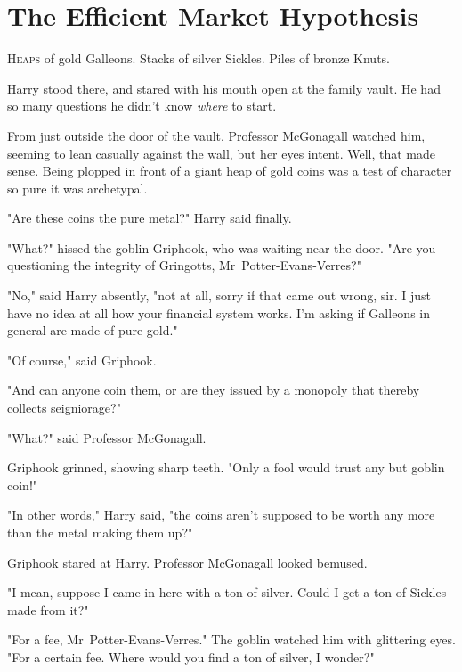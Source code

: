 \chapter[The Efficient Market Hypothesis]{The Efficient Market Hypothesis\protect\footnotemark}


\lettrine{H}{eaps} of gold Galleons. Stacks of silver Sickles. Piles of bronze Knuts.

\quad\quad
Harry stood there, and stared with his mouth open at the family vault. He had
so many questions he didn't know \emph{where} to start.

From just outside the door of the vault, Professor McGonagall watched him,
seeming to lean casually against the wall, but her eyes intent. Well, that made
sense. Being plopped in front of a giant heap of gold coins was a test of
character so pure it was archetypal.

"Are these coins the pure metal?" Harry said finally.

"What?" hissed the goblin Griphook, who was waiting near the door. "Are you
questioning the integrity of Gringotts, Mr~Potter-Evans-Verres?"

"No," said Harry absently, "not at all, sorry if that came out wrong, sir. I
just have no idea at all how your financial system works. I'm asking if
Galleons in general are made of pure gold."

"Of course," said Griphook.

"And can anyone coin them, or are they issued by a monopoly that thereby
collects seigniorage?"

"What?" said Professor McGonagall.

Griphook grinned, showing sharp teeth. "Only a fool would trust any but goblin
coin!"

"In other words," Harry said, "the coins aren't supposed to be worth any more
than the metal making them up?"

Griphook stared at Harry. Professor McGonagall looked bemused.

"I mean, suppose I came in here with a ton of silver. Could I get a ton of
Sickles made from it?"

"For a fee, Mr~Potter-Evans-Verres." The goblin watched him with glittering
eyes. "For a certain fee. Where would you find a ton of silver, I wonder?"

